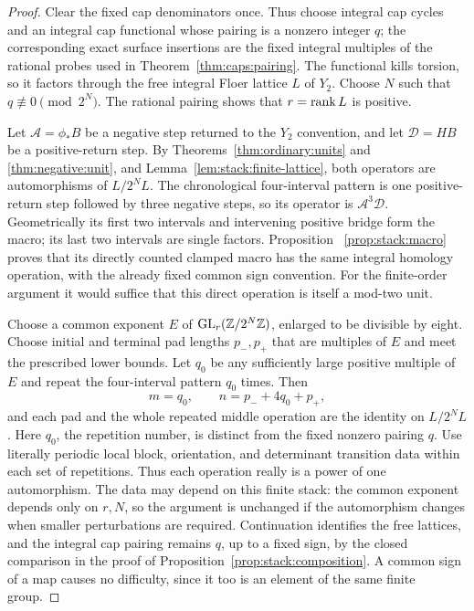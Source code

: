\begin{proof}
Clear the fixed cap denominators once.  Thus choose integral cap
cycles and an integral cap functional whose pairing is a nonzero
integer \(q\); the corresponding exact surface insertions are the
fixed integral multiples of the rational probes used in
Theorem~\ref{thm:caps:pairing}.  The functional kills torsion, so
it factors through the free integral Floer lattice \(L\) of
\(Y_2\).  Choose \(N\) such that \(q\not\equiv0\pmod{2^N}\).
The rational pairing shows that \(r=\operatorname{rank} L\) is positive.

Let \(\mathcal A=\phi_*B\) be a negative step returned to the \(Y_2\)
convention, and let \(\mathcal D=HB\) be a positive-return step.
By Theorems~\ref{thm:ordinary:units} and
\ref{thm:negative:unit}, and Lemma~\ref{lem:stack:finite-lattice},
both operators are automorphisms of \(L/2^NL\).  The chronological
four-interval pattern is one positive-return step followed by three
negative steps, so its operator is \(\mathcal A^3\mathcal D\).  Geometrically its
first two intervals and intervening positive bridge form the macro;
its last two intervals are single factors.  Proposition~
\ref{prop:stack:macro} proves that its directly counted clamped
macro has the same integral homology operation, with the already
fixed common sign convention.  For the finite-order argument it
would suffice that this direct operation is itself a mod-two unit.

Choose a common exponent \(E\) of
\(\operatorname{GL}_r(\mathbb Z/2^N\mathbb Z)\), enlarged to be divisible by eight.
Choose initial and terminal pad lengths \(p_-,p_+\) that are
multiples of \(E\) and meet the prescribed lower bounds.  Let
\(q_0\) be any sufficiently large positive multiple of \(E\)
and repeat the four-interval pattern \(q_0\) times.  Then
\[
 m=q_0,\qquad n=p_-+4q_0+p_+,
\]
and each pad and the whole repeated middle operation are the identity
on \(L/2^NL\).  Here \(q_0\), the repetition number, is distinct
from the fixed nonzero pairing \(q\).
Use literally periodic local block, orientation, and determinant
transition data within each set of repetitions.  Thus each operation
really is a power of one automorphism.  The data may depend on this
finite stack: the common exponent depends only on \(r,N\), so the
argument is unchanged if the automorphism changes when smaller
perturbations are required.  Continuation identifies the free
lattices, and the integral cap pairing remains \(q\), up to a
fixed sign, by the closed comparison in the proof of
Proposition~\ref{prop:stack:composition}.  A common sign of a map
causes no difficulty, since it too is an element of the same finite
group.


\end{proof}
